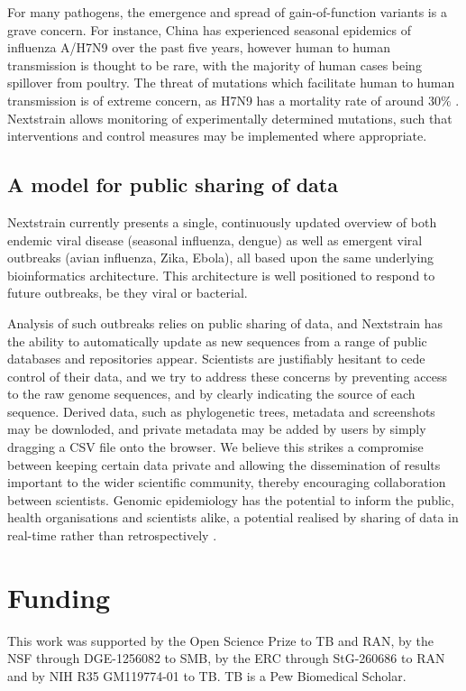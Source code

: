 \documentclass[11pt,oneside,letterpaper]{article}
\begin{document}
For many pathogens, the emergence and spread of gain-of-function variants is a grave concern.
For instance, China has experienced seasonal epidemics of influenza A/H7N9 over the past five years, however human to human transmission is thought to be rare, with the majority of human cases being spillover from poultry.
The threat of mutations which facilitate human to human transmission is of extreme concern, as H7N9 has a mortality rate of around $30\%$ \citep{li2014epidemiology}.
Nextstrain allows monitoring of experimentally determined mutations, such that interventions and control measures may be implemented where appropriate.

\subsection*{A model for public sharing of data}
Nextstrain currently presents a single, continuously updated overview of both endemic viral disease (seasonal influenza, dengue) as well as emergent viral outbreaks (avian influenza, Zika, Ebola), all based upon the same underlying bioinformatics architecture.
This architecture is well positioned to respond to future outbreaks, be they viral or bacterial.

Analysis of such outbreaks relies on public sharing of data, and Nextstrain has the ability to automatically update as new sequences from a range of public databases and repositories appear.
Scientists are justifiably hesitant to cede control of their data, and we try to address these concerns by preventing access to the raw genome sequences, and by clearly indicating the source of each sequence.
Derived data, such as phylogenetic trees, metadata and screenshots may be downloded, and private metadata may be added by users by simply dragging a CSV file onto the browser.
We believe this strikes a compromise between keeping certain data private and allowing the dissemination of results important to the wider scientific community, thereby encouraging collaboration between scientists.
Genomic epidemiology has the potential to inform the public, health organisations and scientists alike, a potential realised by sharing of data in real-time rather than retrospectively \citep{croucher2015application}.

\section*{Funding}

This work was supported by the Open Science Prize to TB and RAN, by the NSF through DGE-1256082 to SMB, by the ERC through StG-260686 to RAN and by NIH R35 GM119774-01 to TB.
TB is a Pew Biomedical Scholar.



\end{document}
